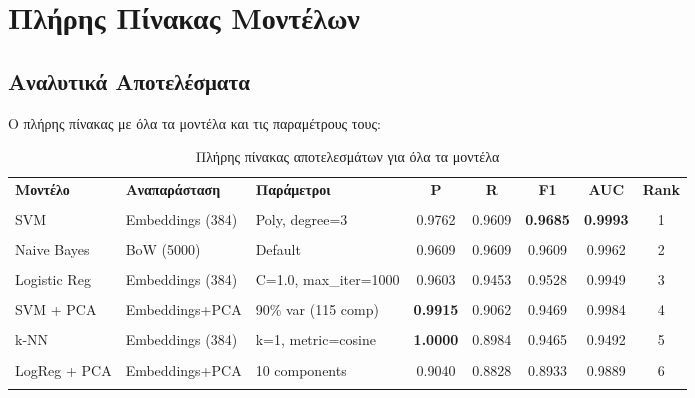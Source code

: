 \documentclass[12pt,a4paper,twoside]{book}
\begin{document}
\appendix

\chapter{Πλήρης Πίνακας Μοντέλων}

\section{Αναλυτικά Αποτελέσματα}

Ο πλήρης πίνακας με όλα τα μοντέλα και τις παραμέτρους τους:

\begin{table}[H]
    \centering
    \small
    \begin{tabular}{lllccccc}
        \hline
        \textbf{Μοντέλο} & \textbf{Αναπαράσταση} & \textbf{Παράμετροι}   & \textbf{P}      & \textbf{R} & \textbf{F1}     & \textbf{AUC}    & \textbf{Rank} \\\\
        \hline
        SVM              & Embeddings (384)      & Poly, degree=3        & 0.9762          & 0.9609     & \textbf{0.9685} & \textbf{0.9993} & 1             \\\\
        Naive Bayes      & BoW (5000)            & Default               & 0.9609          & 0.9609     & 0.9609          & 0.9962          & 2             \\\\
        Logistic Reg     & Embeddings (384)      & C=1.0, max\_iter=1000 & 0.9603          & 0.9453     & 0.9528          & 0.9949          & 3             \\\\
        SVM + PCA        & Embeddings+PCA        & 90\% var (115 comp)   & \textbf{0.9915} & 0.9062     & 0.9469          & 0.9984          & 4             \\\\
        k-NN             & Embeddings (384)      & k=1, metric=cosine    & \textbf{1.0000} & 0.8984     & 0.9465          & 0.9492          & 5             \\\\
        LogReg + PCA     & Embeddings+PCA        & 10 components         & 0.9040          & 0.8828     & 0.8933          & 0.9889          & 6             \\\\
        \hline
    \end{tabular}
    \caption{Πλήρης πίνακας αποτελεσμάτων για όλα τα μοντέλα}
    \label{tab:full-results}
\end{table}
\end{document}
